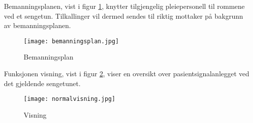 \noindent
Bemanningsplanen, vist i figur \ref{bemanningsplan}, knytter tilgjengelig pleiepersonell til rommene ved et sengetun. Tilkallinger vil dermed sendes til riktig mottaker på bakgrunn av bemanningsplanen. 
\begin{figure}[H]
\centering
\texttt{[image: bemanningsplan.jpg]}
\caption{Bemanningsplan}
\label{bemanningsplan}
\end{figure}
\noindent
Funksjonen visning, vist i figur \ref{visning}, viser en oversikt over pasientsignalanlegget ved det gjeldende sengetunet.
\begin{figure}[H]
\centering
\texttt{[image: normalvisning.jpg]}
\caption{Visning}
\label{visning}
\end{figure}
















